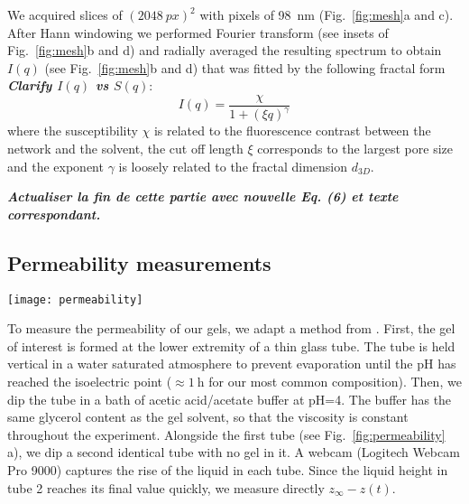 \documentclass[twocolumn,superscriptaddress,showpacs,preprintnumbers,
amsmath,amssymb,prl]{revtex4-1}
\newcommand{\seb}[1]{\textbf{\color{blue}#1}} %
\begin{document}
We acquired slices of $(\SI{2048}{px})^2$ with pixels of \SI{98}{\nano\metre} (Fig.~\ref{fig:mesh}a and c). After Hann windowing we performed Fourier transform (see insets of Fig.~\ref{fig:mesh}b and d) and radially averaged the resulting spectrum to obtain $I(q)$ (see Fig.~\ref{fig:mesh}b and d) that was fitted by the following fractal form \seb{\it Clarify $I(q)$ vs $S(q)$}:
\begin{equation}
I(q) = \frac{\chi}{1+(\xi q)^\gamma}
\label{eq:fractalS}
\end{equation}
where the susceptibility $\chi$ is related to the fluorescence contrast between the network and the solvent, the cut off length $\xi$ corresponds to the largest pore size and the exponent $\gamma$ is loosely related to the fractal dimension $d_{3D}$.

\seb{\it Actualiser la fin de cette partie avec nouvelle Eq. (6) et texte correspondant.}  

\subsection*{Permeability measurements}
\begin{figure*}
	\texttt{[image: permeability]}
	\caption{Permeability measurements. (a) Schematic representation of the experiment. (b-c) Evolution of the height of the interface in tube 1 relative to the final height in tube 2. Black line is the best exponential fit $Ae^{-t/\tau}$. (b) Gel is 4\%w casein, 4\%w GDL in water, $H=\SI{2.3}{\milli\metre}$ and $\tau=\SI{57}{\minute}$. (c) Same as (b) for a 50\%w glycerol--water mixture, $H=\SI{4}{\milli\metre}$ and $\tau=\SI{100}{\hour}$. \seb{\it Changer $z(\infty)$ en $z_\infty$ dans le schema.}}
	\label{fig:permeability}
\end{figure*}

To measure the permeability of our gels, we adapt a method from \cite{VanDijk1986}. First, the gel of interest is formed at the lower extremity of a thin glass tube. The tube is held vertical in a water saturated atmosphere to prevent evaporation until the pH has reached the isoelectric point ($\approx\SI{1}{\hour}$ for our most common composition). Then, we dip the tube in a bath of acetic acid/acetate buffer at pH=4. The buffer has the same glycerol content as the gel solvent, so that the viscosity is constant throughout the experiment. Alongside the first tube (see Fig.~\ref{fig:permeability} a), we dip a second identical tube with no gel in it. A webcam (Logitech Webcam Pro 9000) captures the rise of the liquid in each tube. Since the liquid height in tube 2 reaches its final value quickly, we measure directly $z_\infty-z(t)$.
\end{document}
